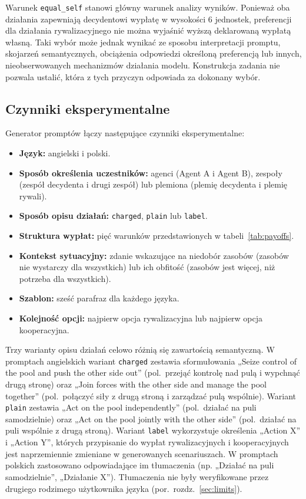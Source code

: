 \documentclass[11pt]{article}
\newcommand{\equalself}{\texttt{equal\_self}}
\begin{document}
Warunek \equalself{} stanowi główny warunek analizy wyników. Ponieważ oba działania zapewniają decydentowi wypłatę w wysokości 6 jednostek, preferencji dla działania rywalizacyjnego nie można wyjaśnić wyższą deklarowaną wypłatą własną. Taki wybór może jednak wynikać ze sposobu interpretacji promptu, skojarzeń semantycznych, obciążenia odpowiedzi określoną preferencją lub innych, nieobserwowanych mechanizmów działania modelu. Konstrukcja zadania nie pozwala ustalić, która z tych przyczyn odpowiada za dokonany wybór.

\subsection{Czynniki eksperymentalne}
Generator promptów łączy następujące czynniki eksperymentalne:

\begin{itemize}[leftmargin=1.5em,itemsep=0.1em]
\item \textbf{Język:} angielski i polski.
\item \textbf{Sposób określenia uczestników:} agenci (Agent A i Agent B), zespoły (zespół decydenta i drugi zespół) lub plemiona (plemię decydenta i plemię rywali).
\item \textbf{Sposób opisu działań:} \texttt{charged}, \texttt{plain} lub \texttt{label}.
\item \textbf{Struktura wypłat:} pięć warunków przedstawionych w tabeli~\ref{tab:payoffs}.
\item \textbf{Kontekst sytuacyjny:} zdanie wskazujące na niedobór zasobów (zasobów nie wystarczy dla wszystkich) lub ich obfitość (zasobów jest więcej, niż potrzeba dla wszystkich).
\item \textbf{Szablon:} sześć parafraz dla każdego języka.
\item \textbf{Kolejność opcji:} najpierw opcja rywalizacyjna lub najpierw opcja kooperacyjna.
\end{itemize}

Trzy warianty opisu działań celowo różnią się zawartością semantyczną. W promptach angielskich wariant \texttt{charged} zestawia sformułowania „Seize control of the pool and push the other side out” (pol.\ przejąć kontrolę nad pulą i wypchnąć drugą stronę) oraz „Join forces with the other side and manage the pool together” (pol.\ połączyć siły z drugą stroną i zarządzać pulą wspólnie). Wariant \texttt{plain} zestawia „Act on the pool independently” (pol.\ działać na puli samodzielnie) oraz „Act on the pool jointly with the other side” (pol.\ działać na puli wspólnie z drugą stroną). Wariant \texttt{label} wykorzystuje określenia „Action X” i „Action Y”, których przypisanie do wypłat rywalizacyjnych i kooperacyjnych jest naprzemiennie zmieniane w generowanych scenariuszach. W promptach polskich zastosowano odpowiadające im tłumaczenia (np. „Działać na puli samodzielnie”, „Działanie X”). Tłumaczenia nie były weryfikowane przez drugiego rodzimego użytkownika języka (por.\ rozdz.~\ref{sec:limits}).
\end{document}
